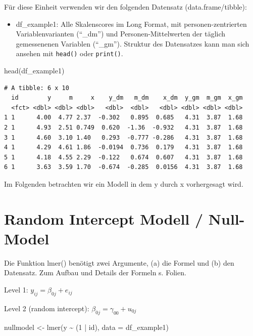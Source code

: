 \documentclass[
  letterpaper,
  DIV=11,
  numbers=noendperiod]{scrreprt}
\newenvironment{Shaded}{\begin{snugshade}}{\end{snugshade}}
\newcommand{\AttributeTok}[1]{\textcolor[rgb]{0.40,0.45,0.13}{#1}}
\newcommand{\DecValTok}[1]{\textcolor[rgb]{0.68,0.00,0.00}{#1}}
\newcommand{\FunctionTok}[1]{\textcolor[rgb]{0.28,0.35,0.67}{#1}}
\newcommand{\NormalTok}[1]{\textcolor[rgb]{0.00,0.23,0.31}{#1}}
\newcommand{\OtherTok}[1]{\textcolor[rgb]{0.00,0.23,0.31}{#1}}
\newcommand{\SpecialCharTok}[1]{\textcolor[rgb]{0.37,0.37,0.37}{#1}}
\providecommand{\tightlist}{%
  \setlength{\itemsep}{0pt}\setlength{\parskip}{0pt}}\usepackage{longtable,booktabs,array}
\begin{document}
Für diese Einheit verwenden wir den folgenden Datensatz
(data.frame/tibble):

\begin{itemize}
\tightlist
\item
  df\_example1: Alle Skalenscores im Long Format, mit
  personen-zentrierten Variablenvarianten (``\_dm'') und
  Personen-Mittelwerten der täglich gemessenenen Variablen (``\_gm'').
  Struktur des Datensatzes kann man sich ansehen mit \texttt{head()}
  oder \texttt{print()}.
\end{itemize}

\begin{Shaded}
\begin{Highlighting}[]
\FunctionTok{head}\NormalTok{(df\_example1)}
\end{Highlighting}
\end{Shaded}

\begin{verbatim}
# A tibble: 6 x 10
  id        y     m     x    y_dm   m_dm    x_dm  y_gm  m_gm  x_gm
  <fct> <dbl> <dbl> <dbl>   <dbl>  <dbl>   <dbl> <dbl> <dbl> <dbl>
1 1      4.00  4.77 2.37  -0.302   0.895  0.685   4.31  3.87  1.68
2 1      4.93  2.51 0.749  0.620  -1.36  -0.932   4.31  3.87  1.68
3 1      4.60  3.10 1.40   0.293  -0.777 -0.286   4.31  3.87  1.68
4 1      4.29  4.61 1.86  -0.0194  0.736  0.179   4.31  3.87  1.68
5 1      4.18  4.55 2.29  -0.122   0.674  0.607   4.31  3.87  1.68
6 1      3.63  3.59 1.70  -0.674  -0.285  0.0156  4.31  3.87  1.68
\end{verbatim}

Im Folgenden betrachten wir ein Modell in dem y durch x vorhergesagt
wird.

\section{Random Intercept Modell /
Null-Model}\label{random-intercept-modell-null-model}

Die Funktion lmer() benötigt zwei Argumente, (a) die Formel und (b) den
Datensatz. Zum Aufbau und Details der Formeln s. Folien.

Level 1: \(y_{ij} = \beta_{0j} + e_{ij}\)

Level 2 (random intercept): \(\beta_{0j} = \gamma_{00} + u_{0j}\)

\begin{Shaded}
\begin{Highlighting}[]
\NormalTok{nullmodel }\OtherTok{\textless{}{-}} \FunctionTok{lmer}\NormalTok{(y }\SpecialCharTok{\textasciitilde{}}\NormalTok{ (}\DecValTok{1} \SpecialCharTok{|}\NormalTok{ id), }\AttributeTok{data =}\NormalTok{ df\_example1)}
\end{Highlighting}
\end{Shaded}
\end{document}
